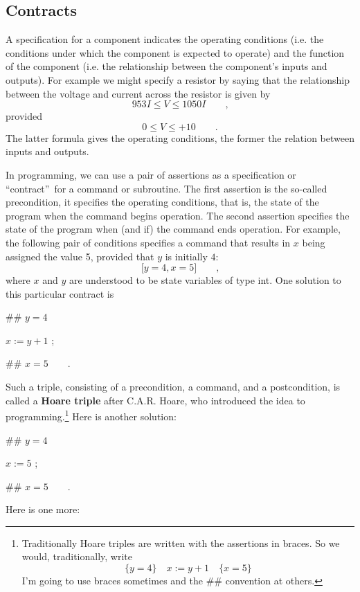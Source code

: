 \documentclass[muchmore,11pt]{article}%
\begin{document}
\subsection{Contracts}

A specification for a component indicates the operating conditions (i.e. the
conditions under which the component is expected to operate) and the function
of the component (i.e. the relationship between the component's inputs and
outputs). For example we might specify a resistor by saying that the
relationship between the voltage and current across the resistor is given by%
\[
953I\leq V\leq1050I\qquad\text{,}%
\]
provided%
\[
0\leq V\leq+10\qquad\text{.}%
\]
The latter formula gives the operating conditions, the former the relation
between inputs and outputs.

In programming, we can use a pair of assertions as a specification or
\textquotedblleft contract\textquotedblright\ for a command or subroutine. The
first assertion is the so-called precondition, it specifies the operating
conditions, that is, the state of the program when the command begins
operation. The second assertion specifies the state of the program when (and
if) the command ends operation. For example, the following pair of conditions
specifies a command that results in $x$ being assigned the value 5, provided
that $y$ is initially $4$:%
\[
\lbrack y=4,x=5]\qquad\text{,}%
\]
where $x$ and $y$ are understood to be state variables of type \textsf{int}.
One solution to this particular contract is

\begin{code}
\#\# $y=4$

$x:=y+1$ ;

\#\# $x=5\qquad$.
\end{code}

\noindent Such a triple, consisting of a precondition, a command, and a
postcondition, is called a \textbf{Hoare triple} after C.A.R. Hoare, who
introduced the idea to programming.\footnote{Traditionally Hoare triples are
written with the assertions in braces. So we would, traditionally, write
\[
\{y=4\}\quad x:=y+1\quad\{x=5\}
\]
I'm going to use braces sometimes and the \#\# convention at others.} Here is
another solution:

\begin{code}
\#\# $y=4$

$x:=5$ ;

\#\# $x=5\qquad$.
\end{code}

\noindent Here is one more:
\end{document}

